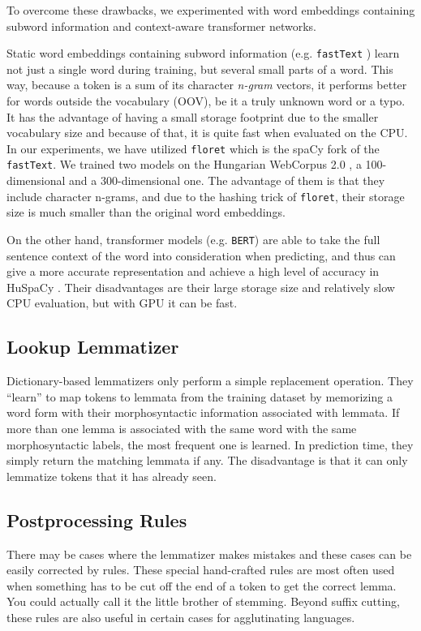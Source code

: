 \documentclass{llncs}
\newcommand{\floret}{\texttt{floret}}
\newcommand{\fasttext}{\texttt{fastText}}
\begin{document}
To overcome these drawbacks, we experimented with word embeddings containing subword information and context-aware transformer networks. 

Static word embeddings containing subword information (e.g. \fasttext{} \citep{bojanowski2017enriching}) learn not just a single word during training, but several small parts of a word. This way, because a token is a sum of its character \textit{n-gram} vectors, it performs better for words outside the vocabulary (OOV), be it a truly unknown word or a typo. It has the advantage of having a small storage footprint due to the smaller vocabulary size and because of that, it is quite fast when evaluated on the CPU. In our experiments, we have utilized \floret{} \citep{floret} which is the spaCy fork of the \fasttext. We trained two models on the Hungarian WebCorpus 2.0 \citep{Nemeskey:2020}, a 100-dimensional and a 300-dimensional one. The advantage of them is that they include character n-grams, and due to the hashing trick of \floret, their storage size is much smaller than the original word embeddings.

On the other hand, transformer models (e.g. \texttt{BERT}) are able to take the full sentence context of the word into consideration when predicting, and thus can give a more accurate representation and achieve a high level of accuracy in HuSpaCy \citep{gergo}. Their disadvantages are their large storage size and relatively slow CPU evaluation, but with GPU it can be fast.

\subsection{Lookup Lemmatizer}

Dictionary-based lemmatizers only perform a simple replacement operation. They “learn” to map tokens to lemmata from the training dataset by memorizing a word form with their morphosyntactic information associated with lemmata. If more than one lemma is associated with the same word with the same morphosyntactic labels, the most frequent one is learned. In prediction time, they simply return the matching lemmata if any. The disadvantage is that it can only lemmatize tokens that it has already seen. 

\subsection{Postprocessing Rules} \label{rules}

There may be cases where the lemmatizer makes mistakes and these cases can be easily corrected by rules. These special hand-crafted rules are most often used when something has to be cut off the end of a token to get the correct lemma. You could actually call it the little brother of stemming. Beyond suffix cutting, these rules are also useful in certain cases for agglutinating languages.
\end{document}
